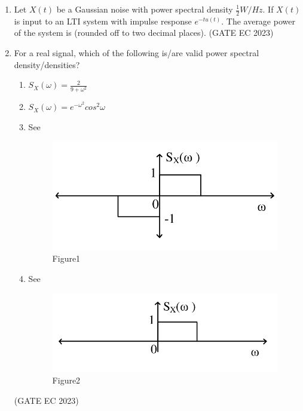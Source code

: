 \begin{enumerate}[label=\thechapter.\arabic*,ref=\thechapter.\theenumi]
\item Let $X(t)$ be a Gaussian noise with power spectral density $\frac{1}{2} W/Hz$. If $X(t)$ is input to an LTI system with impulse response $e^{-tu(t)}$. The average power of the system is (rounded off to two decimal places).
\hfill(GATE EC 2023)\\

\item For a real signal, which of the following is/are valid power spectral density/densities?
\begin{enumerate}
\item \label{eq:EC/30/2023/1}$S_X(\omega)=\frac{2}{9+\omega^2}$
\item \label{eq:EC/30/2023/2}$S_X(\omega)=e^{-\omega^2}cos^2{\omega}$
\item See 
\begin{figure}[ht]
	\centering
	\includegraphics[width=\columnwidth]{2023/EC/30/figs/fig1.png}
    \caption{Figure1}
	\label{Fig:Figure1}
\end{figure}
\item See 
\begin{figure}[ht!]
	\centering
	\includegraphics[width=\columnwidth]{2023/EC/30/figs/fig2.png}
    \caption{Figure2}
	\label{Fig:Figure2}
\end{figure}
\end{enumerate}
\hfill(GATE EC 2023)\\

\end{enumerate}
